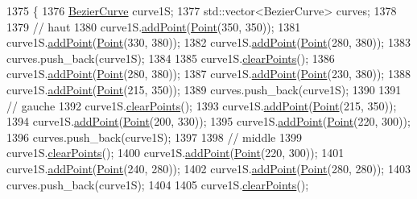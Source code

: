 \begin{DoxyCode}
1375                \{
1376     \mbox{\hyperlink{class_bezier_curve}{BezierCurve}} curve1S;
1377     std::vector<BezierCurve> curves;
1378 
1379     \textcolor{comment}{// haut}
1380     curve1S.\mbox{\hyperlink{class_bezier_curve_a38d16c18b36ae45619b05e26e226cf34}{addPoint}}(\mbox{\hyperlink{class_point}{Point}}(350, 350));
1381     curve1S.\mbox{\hyperlink{class_bezier_curve_a38d16c18b36ae45619b05e26e226cf34}{addPoint}}(\mbox{\hyperlink{class_point}{Point}}(330, 380));
1382     curve1S.\mbox{\hyperlink{class_bezier_curve_a38d16c18b36ae45619b05e26e226cf34}{addPoint}}(\mbox{\hyperlink{class_point}{Point}}(280, 380));
1383     curves.push\_back(curve1S);
1384 
1385     curve1S.\mbox{\hyperlink{class_bezier_curve_a0ba8ce66d5af5971ae6a1b506029728e}{clearPoints}}();
1386     curve1S.\mbox{\hyperlink{class_bezier_curve_a38d16c18b36ae45619b05e26e226cf34}{addPoint}}(\mbox{\hyperlink{class_point}{Point}}(280, 380));
1387     curve1S.\mbox{\hyperlink{class_bezier_curve_a38d16c18b36ae45619b05e26e226cf34}{addPoint}}(\mbox{\hyperlink{class_point}{Point}}(230, 380));
1388     curve1S.\mbox{\hyperlink{class_bezier_curve_a38d16c18b36ae45619b05e26e226cf34}{addPoint}}(\mbox{\hyperlink{class_point}{Point}}(215, 350));
1389     curves.push\_back(curve1S);
1390 
1391     \textcolor{comment}{// gauche}
1392     curve1S.\mbox{\hyperlink{class_bezier_curve_a0ba8ce66d5af5971ae6a1b506029728e}{clearPoints}}();
1393     curve1S.\mbox{\hyperlink{class_bezier_curve_a38d16c18b36ae45619b05e26e226cf34}{addPoint}}(\mbox{\hyperlink{class_point}{Point}}(215, 350));
1394     curve1S.\mbox{\hyperlink{class_bezier_curve_a38d16c18b36ae45619b05e26e226cf34}{addPoint}}(\mbox{\hyperlink{class_point}{Point}}(200, 330));
1395     curve1S.\mbox{\hyperlink{class_bezier_curve_a38d16c18b36ae45619b05e26e226cf34}{addPoint}}(\mbox{\hyperlink{class_point}{Point}}(220, 300));
1396     curves.push\_back(curve1S);
1397 
1398     \textcolor{comment}{// middle}
1399     curve1S.\mbox{\hyperlink{class_bezier_curve_a0ba8ce66d5af5971ae6a1b506029728e}{clearPoints}}();
1400     curve1S.\mbox{\hyperlink{class_bezier_curve_a38d16c18b36ae45619b05e26e226cf34}{addPoint}}(\mbox{\hyperlink{class_point}{Point}}(220, 300));
1401     curve1S.\mbox{\hyperlink{class_bezier_curve_a38d16c18b36ae45619b05e26e226cf34}{addPoint}}(\mbox{\hyperlink{class_point}{Point}}(240, 280));
1402     curve1S.\mbox{\hyperlink{class_bezier_curve_a38d16c18b36ae45619b05e26e226cf34}{addPoint}}(\mbox{\hyperlink{class_point}{Point}}(280, 280));
1403     curves.push\_back(curve1S);
1404 
1405     curve1S.\mbox{\hyperlink{class_bezier_curve_a0ba8ce66d5af5971ae6a1b506029728e}{clearPoints}}();

\end{DoxyCode}
